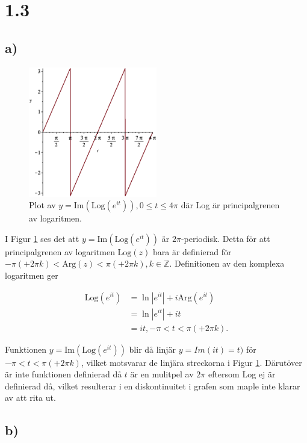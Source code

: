 \documentclass[a4paper]{article}
\begin{document}
\section*{1.3}
\subsection*{a)}

\begin{figure}[h!]
	\centering
	\includegraphics[width=0.5\textwidth]{plot1_2.eps}
	\caption{Plot av $y = \text{Im}(\text{Log}(e^{it})), 0 \leq t \leq 4\pi$ där Log är principalgrenen av logaritmen.}
	\label{fig:1_2}
\end{figure}

I Figur \ref{fig:1_2} ses det att $y = \text{Im}(\text{Log}(e^{it}))$ är $2\pi$-periodisk. Detta för att principalgrenen av logaritmen $\text{Log}(z)$ bara är definierad för $-\pi (+2\pi k)< \text{Arg}(z) < \pi (+2\pi k), k \in \mathbb{Z}$. Definitionen av den komplexa logaritmen ger

\begin{align*}
	\text{Log}(e^{it})	&= \ln|e^{it}| + i\text{Arg}(e^{it})\\
						&= \ln|e^{it}| + it\\
						&= it, -\pi < t < \pi (+2\pi k).
\end{align*}

Funktionen $y = \text{Im}(\text{Log}(e^{it}))$ blir då linjär $y = Im(it) = t)$ för $-\pi < t < \pi (+2\pi k)$, vilket motsvarar de linjära streckorna i Figur \ref{fig:1_2}. Därutöver är inte funktionen definierad då $t$ är en mulitpel av $2\pi$ eftersom Log ej är definierad då, vilket resulterar i en diskontinuitet i grafen som maple inte klarar av att rita ut.

\subsection*{b)}
\end{document}
